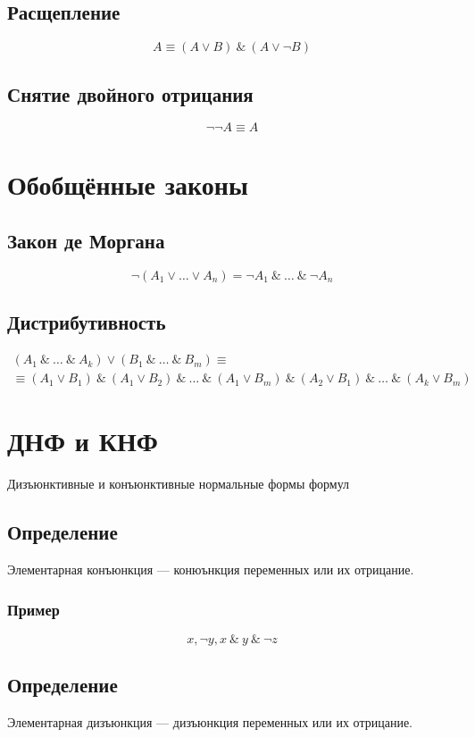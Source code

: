\documentclass{article}
\begin{document}
\subsection{Расщепление}
\[
    A \equiv (A \vee B) ~\&~ (A \vee \neg B)
\]

\subsection{Снятие двойного отрицания}
\[
    \neg \neg A \equiv A
\]



\section{Обобщённые законы}
\subsection{Закон де Моргана}
\[
    \neg (A_1 \vee \dots \vee A_n) = \neg A_1 ~\&~ \dots ~\&~ \neg A_n
\]

\subsection{Дистрибутивность}
\begin{gather*}
    (A_1 ~\&~ \dots ~\&~ A_k) \vee (B_1 ~\&~ \dots ~\&~ B_m) \equiv \\
    \equiv (A_1 \vee B_1) ~\&~ (A_1 \vee B_2) ~\&~ \dots ~\&~ (A_1 \vee B_m) ~\&~ (A_2 \vee B_1) ~\&~ \dots ~\&~ (A_k \vee B_m)
\end{gather*}



\section{ДНФ и КНФ}
Дизъюнктивные и конъюнктивные нормальные формы формул

\subsection{Определение}
Элементарная конъюнкция --- конюънкция переменных или их отрицание.

\subsubsection{Пример}
\[
    x, \neg y, x ~\&~ y ~\&~ \neg z
\]


\subsection{Определение}
Элементарная дизъюнкция --- дизъюнкция переменных или их отрицание.
\end{document}
